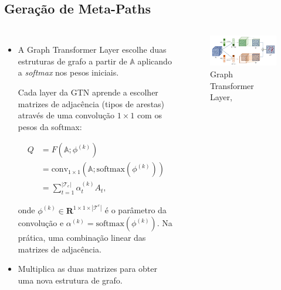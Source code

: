 \documentclass[12pt,notheorems,hyperref={pdfauthor=whatever}]{beamer}
\begin{document}
\subsection{Geração de Meta-Paths}
\begin{frame}
    \begin{columns}
    \begin{itemize}
        \scriptsize
        \item A Graph Transformer Layer escolhe duas estruturas de grafo a partir de $\mathbb{A}$ aplicando a \textit{softmax} nos pesos iniciais.

        \vspace{5pt}
        
        Cada layer da GTN aprende a escolher matrizes de adjacência (tipos de arestas) através de uma convolução $1 \times 1$ com os pesos da softmax:
        
        $$
        \begin{align*}
            Q &= F(\mathbb{A}; \phi^{(k)}) \\
              &= \text{conv}_{1 \times 1}(\mathbb{A}; \text{softmax}(\phi^{(k)})) \\
              &= \sum^{|\mathcal{T}_e|}_{t=1} \alpha_t^{(k)} A_t,
        \end{align*} 
        $$

        onde $\phi^{(k)} \in \mathbf{R}^{1\times1\times |\mathcal{T}^e|}$ é o parâmetro da convolução e $\alpha^{(k)} = \text{softmax}(\phi^{(k)})$. Na prática, uma combinação linear das matrizes de adjacência. 

        \vspace{5pt}
        
        \item Multiplica as duas matrizes para obter uma nova estrutura de grafo.
        
    \end{itemize}
    
    \begin{figure}
        \centering
        \includegraphics[width=10cm]{img/gt-layer.png}
        \caption{Graph Transformer Layer, \cite{DBLP:journals/corr/abs-1911-06455}}
        \label{fig:gt-layer}
    \end{figure}
    \end{columns}

\end{frame}
\end{document}

